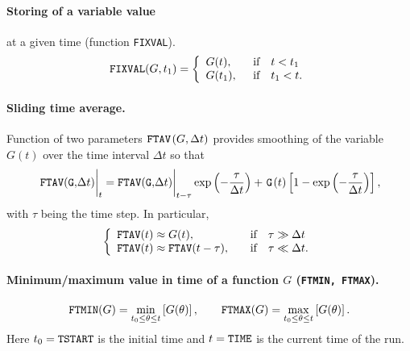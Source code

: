 \paragraph{Storing of a variable value} at a given time 
(function {\tt FIXVAL}).
$$
{\tt FIXVAL}(G,t_1)=
\left\{\begin{array}{ll}
G(t)
,\quad &
\mbox{if}\quad t<t_1\\
G(t_1)
,&
\mbox{if}\quad t_1<t
.\\
\end{array}\right.
$$

\paragraph{Sliding time average.} 
Function of two parameters $\hspace*{1pt}{\tt FTAV}\hspace*{1pt}(G,\Delta t)$
provides smoothing of the variable $G(t)$ over the time interval 
$\Delta t$ so that  
$$
\lb.\lb.\vphantom{\frac{1}{2}}{\tt FTAV(G,}\Delta t)\rb|_t=
{\tt FTAV(G,}\Delta t)\rb|_{t-\tau}\exp\lb(-\frac{\tau}{\Delta t}\rb)
+\tws{G}(t)\lb[1-\exp\lb(-\frac{\tau}{\Delta t}\rb)\rb]
,$$
with $\tau$ being the time step. In particular,
$$
\left\{\begin{array}{ll}
{\tt FTAV}(t)
\approx G(t)
, &
\mbox{if}\quad \tau \gg \Delta t\\
{\tt FTAV}(t)
\approx {\tt FTAV}(t-\tau)
,\quad &
\mbox{if}\quad  \tau \ll \Delta t
.\\
\end{array}\right.
$$

\paragraph{Minimum/maximum value in time of a function $G$ 
({\tt FTMIN, FTMAX}).} 
$$
{\tt FTMIN}(G)=\min\limits_{t_0\leq\theta\leq t}\left[G(\theta)\right]
,\qquad
{\tt FTMAX}(G)=\max\limits_{t_0\leq\theta\leq t}\left[G(\theta)\right]
.$$
Here $t_0=\tt TSTART$ is the initial time and $t=\tt TIME$ is the
current time of the run. 

